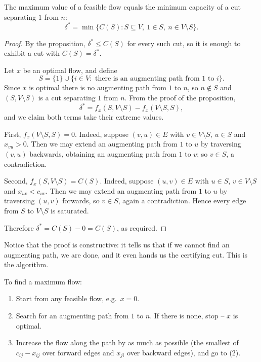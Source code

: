 \begin{theorem}
    The maximum value of a feasible flow equals the minimum capacity of a cut separating $1$ from $n$:
    $$
    \delta^* = \min\{C(S) : S \subseteq V,\ 1 \in S,\ n \in V\setminus S\}.
    $$
\end{theorem}
\begin{proof}
    By the proposition, $\delta^* \leq C(S)$ for every such cut, so it is enough to exhibit a cut with $C(S) = \delta^*$.

    Let $x$ be an optimal flow, and define
    $$
    S = \{1\}\cup\{i \in V : \text{ there is an augmenting path from } 1 \text{ to } i\}.
    $$
    Since $x$ is optimal there is no augmenting path from $1$ to $n$, so $n \notin S$ and $(S, V\setminus S)$ is a cut separating $1$ from $n$. From the proof of the proposition,
    $$
    \delta^* = f_x(S, V\setminus S) - f_x(V\setminus S, S),
    $$
    and we claim both terms take their extreme values.

    First, $f_x(V\setminus S, S) = 0$. Indeed, suppose $(v, u) \in E$ with $v \in V\setminus S$, $u \in S$ and $x_{vu} > 0$. Then we may extend an augmenting path from $1$ to $u$ by traversing $(v,u)$ backwards, obtaining an augmenting path from $1$ to $v$; so $v \in S$, a contradiction.

    Second, $f_x(S, V\setminus S) = C(S)$. Indeed, suppose $(u, v)\in E$ with $u \in S$, $v \in V\setminus S$ and $x_{uv} < c_{uv}$. Then we may extend an augmenting path from $1$ to $u$ by traversing $(u,v)$ forwards, so $v \in S$, again a contradiction. Hence every edge from $S$ to $V\setminus S$ is saturated.

    Therefore $\delta^* = C(S) - 0 = C(S)$, as required.
\end{proof}

Notice that the proof is constructive: it tells us that if we cannot find an augmenting path, we are done, and it even hands us the certifying cut. This is the algorithm.

\begin{definition}
    To find a maximum flow:
    \begin{enumerate}[label=(\arabic*)]
        \item Start from any feasible flow, e.g.\ $x = 0$.
        \item Search for an augmenting path from $1$ to $n$. If there is none, stop -- $x$ is optimal.
        \item Increase the flow along the path by as much as possible (the smallest of $c_{ij} - x_{ij}$ over forward edges and $x_{ji}$ over backward edges), and go to (2).
    \end{enumerate}
\end{definition}

